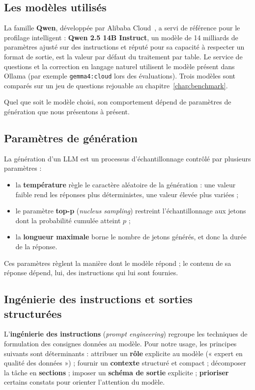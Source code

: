\subsection{Les modèles utilisés}

La famille \textbf{Qwen}, développée par Alibaba Cloud~\cite{qwen25}, a servi de référence pour le profilage intelligent : \textbf{Qwen 2.5 14B Instruct}, un modèle de 14 milliards de paramètres ajusté sur des instructions et réputé pour sa capacité à respecter un format de sortie, est la valeur par défaut du traitement par table. Le service de questions et la correction en langage naturel utilisent le modèle présent dans Ollama (par exemple \texttt{gemma4:cloud} lors des évaluations). Trois modèles sont comparés sur un jeu de questions rejouable au chapitre~\ref{chap:benchmark}.

Quel que soit le modèle choisi, son comportement dépend de paramètres de génération que nous présentons à présent.

\subsection{Paramètres de génération}

La génération d'un LLM est un processus d'échantillonnage contrôlé par plusieurs paramètres :
\begin{itemize}
  \item la \textbf{température} règle le caractère aléatoire de la génération : une valeur faible rend les réponses plus déterministes, une valeur élevée plus variées ;
  \item le paramètre \textbf{top-p} (\textit{nucleus sampling}) restreint l'échantillonnage aux jetons dont la probabilité cumulée atteint $p$ ;
  \item la \textbf{longueur maximale} borne le nombre de jetons générés, et donc la durée de la réponse.
\end{itemize}

Ces paramètres règlent la manière dont le modèle répond ; le contenu de sa réponse dépend, lui, des instructions qui lui sont fournies.

\subsection{Ingénierie des instructions et sorties structurées}

L'\textbf{ingénierie des instructions} (\textit{prompt engineering}) regroupe les techniques de formulation des consignes données au modèle. Pour notre usage, les principes suivants sont déterminants : attribuer un \textbf{rôle} explicite au modèle (« expert en qualité des données ») ; fournir un \textbf{contexte} structuré et compact ; décomposer la tâche en \textbf{sections} ; imposer un \textbf{schéma de sortie} explicite ; \textbf{prioriser} certains constats pour orienter l'attention du modèle.

